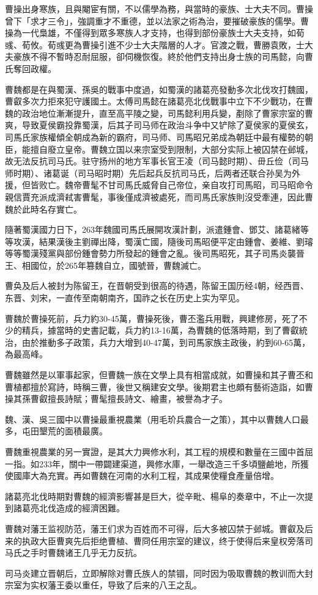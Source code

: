 曹操出身寒族，且與閹宦有關，不以儒學為務，與當時的豪族、士大夫不同。曹操曾下「求才三令」，強調重才不重德，並以法家之術為治，要摧破豪族的儒學。曹操為一代梟雄，不僅得到眾多寒族人才支持，也得到部份豪族士大夫支持，如荀彧、荀攸。荀彧更為曹操引進不少士大夫階層的人才。官渡之戰，曹勝袁敗，士大夫豪族不得不暫時忍耐屈服，卻伺機恢復。終於他們支持出身士族的司馬懿，向曹氏奪回政權。

曹魏都是在與蜀漢、孫吳的戰事中度過，如蜀漢的諸葛亮發動多次北伐攻打魏國，曹叡多次力拒來犯守護國土。太傅司馬懿在諸葛亮北伐戰事中立下不少戰功，在曹魏的政治地位漸漸提升，直至高平陵之變，司馬懿利用兵變，剷除了曹家宗室的曹爽，导致夏侯霸投靠蜀漢，后其子司马师在政治斗争中又铲除了夏侯家的夏侯玄，司馬氏家族權傾全朝成為新的霸府，司马师、司馬昭兄弟成為朝廷中最有權勢的朝臣，能擅自廢立皇帝。曹魏立国以来宗室受到限制，大部分实际上被囚禁在邺城，故无法反抗司马氏。驻守扬州的地方军事长官王凌（司马懿时期）、毌丘俭（司马师时期）、诸葛诞（司马昭时期）先后起兵反抗司马氏，后两者还联合孙吴为外援，但皆败亡。魏帝曹髦不甘司馬氏威脅自己帝位，亲自攻打司馬昭，司马昭命令親信賈充派成濟弒害曹髦，事後僅成濟被處死，而司馬氏家族則沒受牽連，因此曹魏於此時名存實亡。

隨著蜀漢國力日下，263年魏國司馬氏展開攻漢計劃，派遣鍾會、鄧艾、諸葛緒等等攻漢，結果漢後主劉禪出降，蜀漢亡國，隨後司馬昭便平定由鍾會、姜維、劉璿等等蜀漢殘黨與部份鍾會勢力所發起的鍾會之亂。後司馬昭死，其子司馬炎襲晉王、相國位，於265年篡魏自立，國號晉，曹魏滅亡。

曹奂及后人被封为陈留王，在晋朝受到很高的待遇，陈留王国历经4朝，经西晋、东晋、刘宋，一直传至南朝南齐，国祚之长在历史上实为罕见。

曹魏於曹操死前，兵力約30-45萬，曹操死後，曹丕濫兵用戰，興建修房，死了不少的精兵，據當時的史書記載，兵力約13-16萬，為曹魏的低落時期，到了曹叡統治，由於推動多子政策，兵力大增到40-47萬，到司馬家族主政後，約到60-65萬，為最高峰。

曹魏雖然是以軍事起家，但曹魏一族在文學上具有相當成就，如曹操和其子曹丕和曹植都擅於寫詩，時稱三曹，後世又稱建安文學。後期君主也頗有藝術造詣，如曹操其孫曹叡擅長詩賦；曹髦擅長詩文、繪畫，被譽為才子。

魏、漢、吳三國中以曹操最重視農業（用毛玠兵農合一之策），其中以曹魏人口最多，屯田墾荒的面積最廣。

曹魏重視農業的另一實證，是其大力興修水利，其工程的規模和數量在三國中首屈一指。如233年，關中一帶闢建渠道，興修水庫，一舉改造三千多頃鹽鹼地，所獲使國庫大為充實。再如曹魏在河南的水利工程，其成果使糧食產量倍增。

諸葛亮北伐時期對曹魏的經濟影響甚是巨大，從辛毗、楊阜的奏章中，不止一次提到諸葛亮北伐造成的經濟困難。

曹魏对藩王监视防范，藩王们求为百姓而不可得，后大多被囚禁于邺城。曹叡及后来的执政大臣曹爽先后拒绝曹植、曹冏任用宗室的建议，终于使得后来皇权旁落司马氏之手时曹魏诸王几乎无力反抗。

司马炎建立晋朝后，立即解除对曹氏族人的禁锢，同时因为吸取曹魏的教训而大封宗室为实权藩王委以重任，导致了后来的八王之乱。







